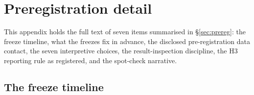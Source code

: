 %
%

\section{Preregistration detail}
\label{app:prereg-detail}

This appendix holds the full text of seven items summarised in
\S\ref{sec:prereg}: the freeze timeline, what the freezes fix in advance, the
disclosed pre-registration data contact, the seven interpretive choices, the
result-inspection discipline, the H3 reporting rule as registered, and the
spot-check narrative.

\subsection{The freeze timeline}
\label{app:prereg:timeline}

